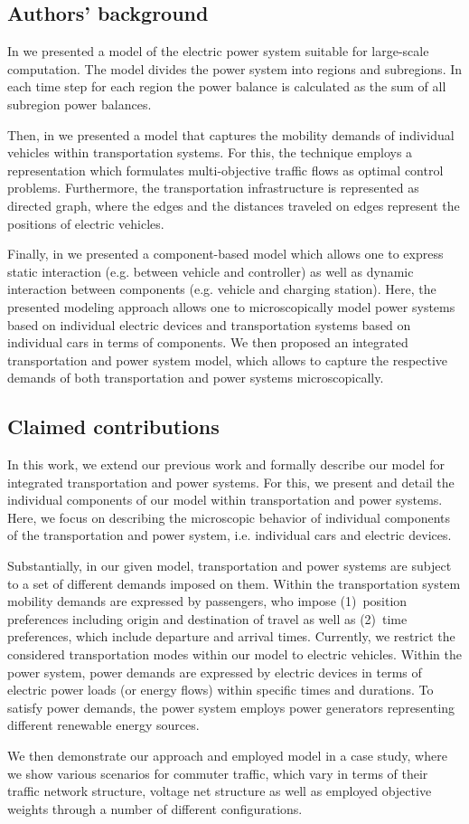 \subsection{Authors' background}
\label{backgrounds}

In \cite{Hackenberg2012} we presented a model of the electric power system suitable for large-scale computation. The model divides the power system into regions and subregions. In each time step for each region the power balance is calculated as the sum of all subregion power balances.

Then, in \cite{ascher2014early} we presented a model that captures the mobility demands of individual vehicles within transportation systems. For this, the technique employs a representation which formulates multi-objective traffic flows as optimal control problems. Furthermore, the transportation infrastructure is represented as directed graph, where the edges and the distances traveled on edges represent the positions of electric vehicles.

Finally, in \cite{ascher2015integrated} we presented a component-based model which allows one to express static interaction (e.g. between vehicle and controller) as well as dynamic interaction between components (e.g. vehicle and charging station). Here, the presented modeling approach allows one to microscopically model power systems based on individual electric devices and transportation systems based on individual cars in terms of components. We then proposed an integrated transportation and power system model, which allows to capture the respective demands of both transportation and power systems microscopically.

\subsection{Claimed contributions}
\label{contributions}

In this work, we extend our previous work and formally describe our model for integrated transportation and power systems. For this, we present and detail the individual components of our model within transportation and power systems. Here, we focus on describing the microscopic behavior of individual components of the transportation and power system, i.e. individual cars and electric devices.

Substantially, in our given model, transportation and power systems are subject to a set of different demands imposed on them. Within the transportation system mobility demands are expressed by passengers, who impose (1)~position preferences including origin and destination of travel as well as (2)~time preferences, which include departure and arrival times. Currently, we restrict the considered transportation modes within our model to electric vehicles. Within the power system, power demands are expressed by electric devices in terms of electric power loads (or energy flows) within specific times and durations. To satisfy power demands, the power system employs power generators representing different renewable energy sources.

We then demonstrate our approach and employed model in a case study, where we show various scenarios for commuter traffic, which vary in terms of their traffic network structure, voltage net structure as well as employed objective weights through a number of different configurations.
